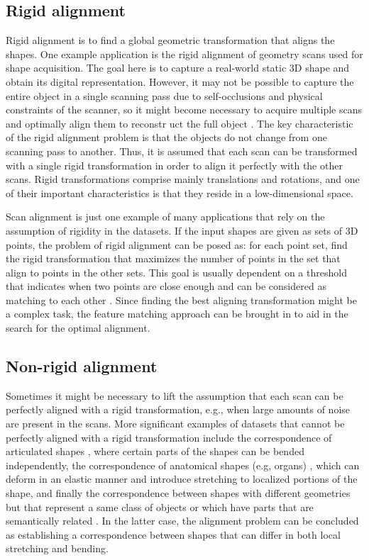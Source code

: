 \subsection{Rigid alignment} Rigid alignment is to find a global geometric transformation that aligns the shapes. One example application is the rigid alignment of geometry scans used for shape acquisition. The goal here is to capture a real-world static 3D shape and obtain its digital representation. However, it may not be possible to capture the entire object in a single scanning pass due to self-occlusions and physical constraints of the scanner, so it might become necessary to acquire multiple scans and optimally align them to reconstr uct the full object \citep{turk1994zippered,rusinkiewicz2001efficient,gelfand2005robust,aiger20084}. The key characteristic of the rigid alignment problem is that the objects do not change from one scanning pass to another. Thus, it is assumed that each scan can be transformed with a single rigid transformation in order to align it perfectly with the other scans. Rigid transformations comprise mainly translations and rotations, and one of their important characteristics is that they reside in a low-dimensional space.

Scan alignment is just one example of many applications that rely on the assumption of rigidity in the datasets. If the input shapes are given as sets of 3D points, the problem of rigid alignment can be posed as: for each point set, find the rigid transformation that maximizes the number of points in the set that align to points in the other sets. This goal is usually dependent on a threshold that indicates when two points are close enough and can be considered as matching to each other \citep{irani1999combinatorial}. Since finding the best aligning transformation might be a complex task, the feature matching approach can be brought in to aid in the search for the optimal alignment.

\subsection{Non-rigid alignment} Sometimes it might be necessary to lift the assumption that each scan can be perfectly aligned with a rigid transformation, e.g., when large amounts of noise are present in the scans. More significant examples of datasets that cannot be perfectly aligned with a rigid transformation include the correspondence of articulated shapes \citep{elad2003bending,anguelov2005correlated,jain2007non,chang2008automatic,huang2008non}, where certain parts of the shapes can be bended independently, the correspondence of anatomical shapes (e.g, organs) \citep{audette2000algorithmic}, which can deform in an elastic manner and introduce stretching to localized portions of the shape, and finally the correspondence between shapes with different geometries but that represent a same class of objects or which have parts that are semantically related \citep{allen2003space,zhang2008deformation}. In the latter case, the alignment problem can be concluded as establishing a correspondence between shapes that can differ in both local stretching and bending.

